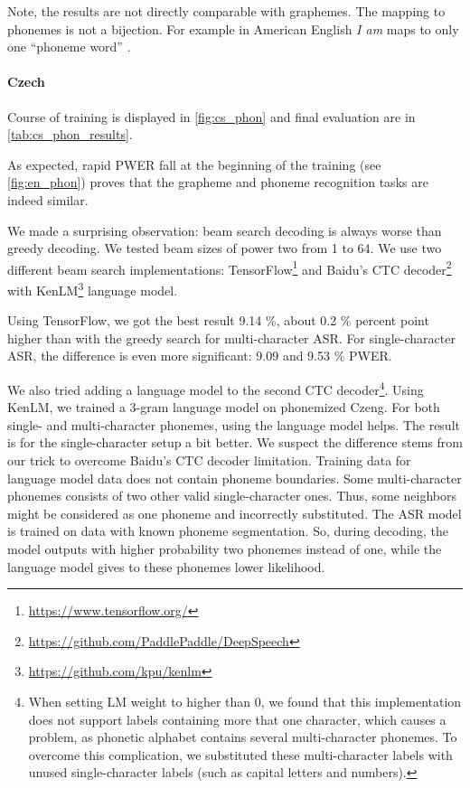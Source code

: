 Note, the results are not directly comparable with graphemes. The mapping to phonemes is not a bijection. For example in American English \emph{I am} maps to only one ``phoneme word'' \textipa{[aI\ae m]}.

\paragraph{Czech}
Course of training is displayed in \cref{fig:cs_phon} and final evaluation are in \cref{tab:cs_phon_results}. 

As expected, rapid PWER fall at the beginning of the training (see \cref{fig:en_phon}) proves that the grapheme and phoneme recognition tasks are indeed similar.

We made a surprising observation: beam search decoding is always worse than greedy decoding. We tested beam sizes of power two from 1 to 64. We use two different beam search implementations: TensorFlow\footnote{\url{https://www.tensorflow.org/}} and Baidu's CTC decoder\footnote{\url{https://github.com/PaddlePaddle/DeepSpeech}} with KenLM\footnote{\url{https://github.com/kpu/kenlm}} language model. 

Using TensorFlow, we got the best result 9.14 \%, about 0.2 \% percent point higher than with the greedy search for multi-character ASR. For single-character ASR, the difference is even more significant: 9.09 and 9.53 \% PWER. 

We also tried adding a language model to the second CTC decoder\footnote{When setting LM weight to higher than 0, we found that this implementation does not support labels containing more that one character, which causes a problem, as phonetic alphabet contains several multi-character phonemes. To overcome this complication, we substituted these multi-character labels with unused single-character labels (such as capital letters and numbers).}. Using KenLM, we trained a 3-gram language model on phonemized Czeng. For both single- and multi-character phonemes, using the language model helps. The result is for the single-character setup a bit better. We suspect the difference stems from our trick to overcome Baidu's CTC decoder limitation. Training data for language model data does not contain phoneme boundaries. Some multi-character phonemes consists of two other valid single-character ones. Thus, some neighbors might be considered as one phoneme and incorrectly substituted. The ASR model is trained on data with known phoneme segmentation. So, during decoding, the model outputs with higher probability two phonemes instead of one, while the language model gives to these phonemes lower likelihood.

